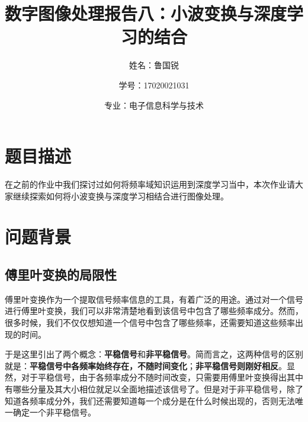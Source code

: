\documentclass[UTF8]{ctexart}
\title{数字图像处理报告八：小波变换与深度学习的结合}
\author{姓名：鲁国锐 \protect\newline
\and 学号：17020021031 \\
\and 专业：电子信息科学与技术}
\begin{document}
	\maketitle
	\renewcommand{\contentsname}{目录}
	\renewcommand{\listfigurename}{插图目录}
	\renewcommand{\listtablename}{表格目录}
	\renewcommand{\refname}{参考文献}
	\renewcommand{\abstractname}{摘要}
	\renewcommand{\indexname}{索引}
	\renewcommand{\tablename}{表}
	\renewcommand{\figurename}{图}
	
	
	
	\tableofcontents
	\newpage
	
	\hypersetup{
	bookmarks=true,
	colorlinks=true,
	linkcolor=red,
	urlcolor=blue
	}
	\section{题目描述}
	\indent 在之前的作业中我们探讨过如何将频率域知识运用到深度学习当中，本次作业请大家继续探索如何将小波变换与深度学习相结合进行图像处理。

			

		


	
	\section{问题背景\protect\footnotemark[1]}\label{background}
    
        \subsection{傅里叶变换的局限性}\label{limitation of Fourier Transformation}
            \indent 傅里叶变换作为一个提取信号频率信息的工具，有着广泛的用途。通过对一个信号进行傅里叶变换，我们可以非常清楚地看到该信号中包含了哪些频率成分。然而，很多时候，我们不仅仅想知道一个信号中包含了哪些频率，还需要知道这些频率出现的时间。
            
            \indent 于是这里引出了两个概念：\textbf{平稳信号}和\textbf{非平稳信号}。简而言之，这两种信号的区别就是：\textbf{平稳信号中各频率始终存在，不随时间变化}；\textbf{非平稳信号则刚好相反}。显然，对于平稳信号，由于各频率成分不随时间改变，只需要用傅里叶变换得出其中有哪些分量及其大小相位就足以全面地描述该信号了。但是对于非平稳信号，除了知道各频率成分外，我们还需要知道每一个成分是在什么时候出现的，否则无法唯一确定一个非平稳信号。
                
\end{document}
